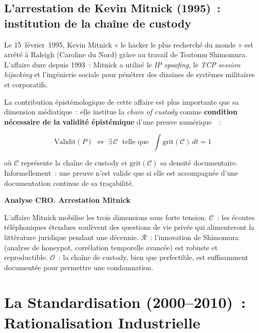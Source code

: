 \subsection{L'arrestation de Kevin Mitnick (1995)~: institution de la chaîne de custody}

Le 15~février~1995, Kevin Mitnick « le hacker le plus recherché du monde » est arrêté à Raleigh (Caroline du Nord) grâce au travail de Tsutomu
Shimomura. L'affaire dure depuis 1993~: Mitnick a utilisé le \textit{IP
spoofing}, le \textit{TCP session hijacking} et l'ingénierie sociale pour
pénétrer des dizaines de systèmes militaires et corporatifs.

\medskip

La contribution épistémologique de cette affaire est plus importante que
sa dimension médiatique~: elle institue la \textit{chain of custody}
comme \textbf{condition nécessaire de la validité épistémique} d'une
preuve numérique~\cite{casey2004}~:

\begin{equation}
\mathrm{Validit}(P) \;\Leftrightarrow\;
\exists\, \mathcal{C} \;\text{ telle que }\; \int \mathrm{grit}(\mathcal{C})\,dt = 1
\label{eq:validite-custody}
\end{equation}

où $\mathcal{C}$ représente la chaîne de custody et $\mathrm{grit}(\mathcal{C})$
sa densité documentaire. Informellement~: une preuve n'est valide que si elle
est accompagnée d'une documentation continue de sa traçabilité.

\begin{boxCRO}
\textbf{Analyse CRO. Arrestation Mitnick}

L'affaire Mitnick mobilise les trois dimensions sous forte tension.
$\mathcal{C}$~: les écoutes téléphoniques étendues soulèvent des questions
de vie privée qui alimenteront la littérature juridique pendant une décennie.
$\mathcal{R}$~: l'innovation de Shimomura (analyse de honeypot, corrélation
temporelle avancée) est robuste et reproductible. $\mathcal{O}$~: la chaîne
de custody, bien que perfectible, est suffisamment documentée pour permettre
une condamnation.
\end{boxCRO}

\section{La Standardisation (2000--2010)~: Rationalisation Industrielle}

